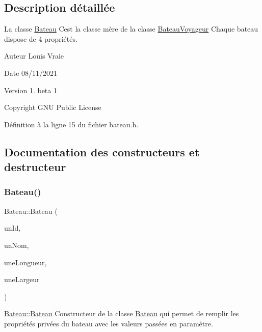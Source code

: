 \subsection{Description détaillée}
La classe \hyperlink{class_bateau}{Bateau} C\textquotesingle{}est la classe mère de la classe \hyperlink{class_bateau_voyageur}{Bateau\+Voyageur} Chaque bateau dispose de 4 propriétés. 

\begin{DoxyAuthor}{Auteur}
Louis Vraie 
\end{DoxyAuthor}
\begin{DoxyDate}{Date}
08/11/2021 
\end{DoxyDate}
\begin{DoxyVersion}{Version}
1. beta 1 
\end{DoxyVersion}
\begin{DoxyCopyright}{Copyright}
G\+NU Public License 
\end{DoxyCopyright}


Définition à la ligne 15 du fichier bateau.\+h.



\subsection{Documentation des constructeurs et destructeur}
\mbox{\label{class_bateau_a5ea29ce02b632a199385200248a05581}} 
\subsubsection{\texorpdfstring{Bateau()}{Bateau()}\hspace{0.1cm}{\footnotesize\ttfamily [1/2]}}
{\footnotesize\ttfamily Bateau\+::\+Bateau (\begin{DoxyParamCaption}\item[{Q\+String}]{un\+Id,  }\item[{Q\+String}]{un\+Nom,  }\item[{float}]{une\+Longueur,  }\item[{float}]{une\+Largeur }\end{DoxyParamCaption})}



\hyperlink{class_bateau_a5ea29ce02b632a199385200248a05581}{Bateau\+::\+Bateau} Constructeur de la classe \hyperlink{class_bateau}{Bateau} qui permet de remplir les propriétés privées du bateau avec les valeurs passées en paramètre. 


